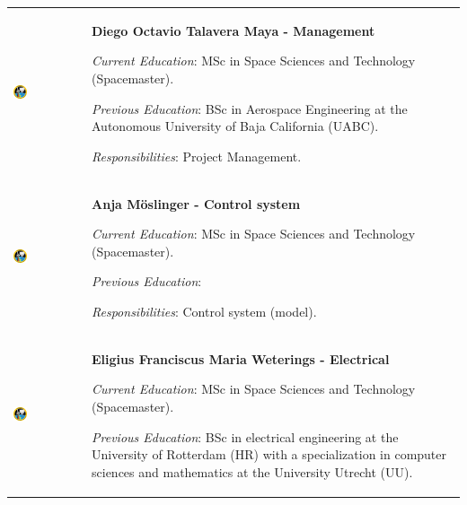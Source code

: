 
\begin{longtable}[]{m{} m{}}

\includegraphics[width=0.2\textwidth]{0-cover/img/logo-rexus-bexus.png} & \textbf{Diego Octavio Talavera Maya - Management}

\smallskip
\textit{Current Education}: MSc in Space Sciences and Technology (Spacemaster).

\smallskip
\textit{Previous Education}: BSc in Aerospace Engineering at the Autonomous University of Baja California (UABC).

\smallskip
\textit{Responsibilities}: Project Management.
\bigskip
\\

 \includegraphics[width=0.2\textwidth]{0-cover/img/logo-rexus-bexus.png}  & \textbf{Anja M\"oslinger - Control system}

\smallskip
\textit{Current Education}: MSc in Space Sciences and Technology (Spacemaster).

\smallskip
\textit{Previous Education}:

\smallskip
\textit{Responsibilities}: Control system (model).
\bigskip
\\

 \includegraphics[width=0.2\textwidth]{0-cover/img/logo-rexus-bexus.png}  & \textbf{Eligius Franciscus Maria Weterings - Electrical}

\smallskip
\textit{Current Education}: MSc in Space Sciences and Technology (Spacemaster).

\smallskip
\textit{Previous Education}: BSc in electrical engineering at the University of Rotterdam (HR) with a specialization in computer sciences and mathematics at the University Utrecht (UU). 


\end{longtable}
